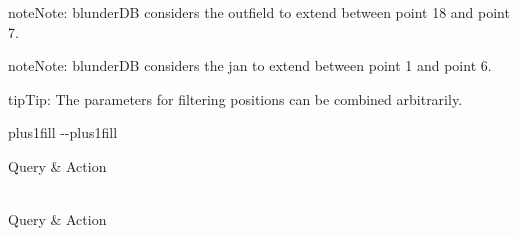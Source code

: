 \documentclass[letterpaper,10pt,english]{sphinxmanual}
\begin{document}
\begin{sphinxadmonition}{note}{Note:}
\sphinxAtStartPar
blunderDB considers the outfield to extend between point 18 and point 7.
\end{sphinxadmonition}

\begin{sphinxadmonition}{note}{Note:}
\sphinxAtStartPar
blunderDB considers the jan to extend between point 1 and point 6.
\end{sphinxadmonition}

\begin{sphinxadmonition}{tip}{Tip:}
\sphinxAtStartPar
The parameters for filtering positions can be combined arbitrarily.
\end{sphinxadmonition}


\begin{savenotes}
\sphinxatlongtablestart
\sphinxthistablewithglobalstyle
\makeatletter
  \LTleft \@totalleftmargin plus1fill
  \LTright\dimexpr\columnwidth-\@totalleftmargin-\linewidth\relax plus1fill
\makeatother
\begin{longtable}{}
\sphinxtoprule
\sphinxstyletheadfamily 
\sphinxAtStartPar
Query
&\sphinxstyletheadfamily 
\sphinxAtStartPar
Action
\\
\sphinxmidrule
\endfirsthead

\\
\sphinxtoprule
\sphinxstyletheadfamily 
\sphinxAtStartPar
Query
&\sphinxstyletheadfamily 
\sphinxAtStartPar
Action
\\
\sphinxmidrule
\endhead

\sphinxbottomrule
{}\\
\endfoot

\endlastfoot
\sphinxtableatstartofbodyhook


\end{longtable}
\end{savenotes}
\end{document}
